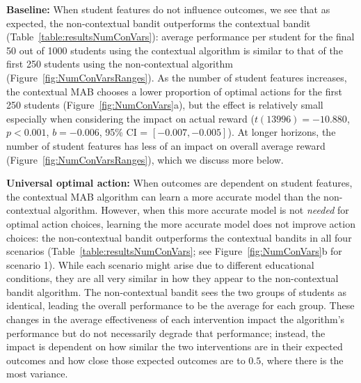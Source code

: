 \textbf{Baseline:} When student features do not influence outcomes, we see that as expected, the non-contextual bandit outperforms the contextual bandit (Table~\ref{table:resultsNumConVars}): average performance per student for the final 50 out of 1000 students using the contextual algorithm is similar to that of the first 250 students using the non-contextual algorithm (Figure~\ref{fig:NumConVarsRanges}). 
As the number of student features increases, the contextual MAB chooses a lower proportion of optimal actions for the first 250 students (Figure~\ref{fig:NumConVars}a), but the effect is relatively small especially when considering the impact on actual reward ($t(13996)=-10.880$, $p<0.001$, $b=-0.006$, 95\% CI = $[-0.007, -0.005]$). At longer horizons, the number of student features has less of an impact on overall average reward (Figure~\ref{fig:NumConVarsRanges}), which we discuss more below.


\textbf{Universal optimal action:} When outcomes are dependent on student features, the contextual MAB algorithm can learn a more accurate model than the non-contextual algorithm. However, when this more accurate model is not \textit{needed} for optimal action choices, learning the more accurate model does not improve action choices: the non-contextual bandit outperforms the contextual bandits in all four scenarios (Table~\ref{table:resultsNumConVars}; see Figure~\ref{fig:NumConVars}b for scenario 1).  While each scenario might arise due to different educational conditions, they are all very similar in how they appear to the non-contextual bandit algorithm.
The non-contextual bandit sees the two groups of students as identical, leading the overall performance to be the average for each group.
These changes in the average effectiveness of each intervention impact the algorithm's performance but do not necessarily degrade that performance; instead, the impact is dependent on how similar the two interventions are in their expected outcomes and how close those expected outcomes are to $0.5$, where there is the most variance.


